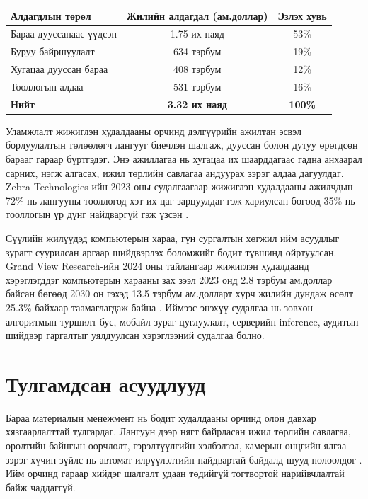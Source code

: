 \begin{table}[H]
\centering
\caption{Жижиглэн худалдааны салбарын бараа материалын алдагдлын статистик}
\label{tab:retail_loss_stats}
\begin{longtable}{|p{5cm}|c|c|}
\hline
\textbf{Алдагдлын төрөл} & \textbf{Жилийн алдагдал (ам.доллар)} & \textbf{Эзлэх хувь} \\
\hline
Бараа дууссанаас үүдсэн & 1.75 их наяд & 53\% \\
\hline
Буруу байршуулалт & 634 тэрбум & 19\% \\
\hline
Хугацаа дууссан бараа & 408 тэрбум & 12\% \\
\hline
Тооллогын алдаа & 531 тэрбум & 16\% \\
\hline
\textbf{Нийт} & \textbf{3.32 их наяд} & \textbf{100\%} \\
\hline
\end{longtable}
\end{table}

Уламжлалт жижиглэн худалдааны орчинд дэлгүүрийн ажилтан эсвэл борлуулалтын төлөөлөгч лангууг биечлэн шалгаж, дууссан болон дутуу өрөгдсөн барааг гараар бүртгэдэг. Энэ ажиллагаа нь хугацаа их шаарддагаас гадна анхаарал сарних, нэгж алгасах, ижил төрлийн савлагаа андуурах зэрэг алдаа дагуулдаг. Zebra Technologies-ийн 2023 оны судалгаагаар жижиглэн худалдааны ажилчдын 72\% нь лангууны тооллогод хэт их цаг зарцуулдаг гэж хариулсан бөгөөд 35\% нь тооллогын үр дүнг найдваргүй гэж үзсэн \cite{zebra_study}.

Сүүлийн жилүүдэд компьютерын хараа, гүн сургалтын хөгжил ийм асуудлыг зурагт суурилсан аргаар шийдвэрлэх боломжийг бодит түвшинд ойртуулсан. Grand View Research-ийн 2024 оны тайлангаар жижиглэн худалдаанд хэрэглэгддэг компьютерын харааны зах зээл 2023 онд 2.8 тэрбум ам.доллар байсан бөгөөд 2030 он гэхэд 13.5 тэрбум ам.долларт хүрч жилийн дундаж өсөлт 25.3\% байхаар таамаглагдаж байна \cite{grand_view_cv}. Иймээс энэхүү судалгаа нь зөвхөн алгоритмын туршилт бус, мобайл зураг цуглуулалт, серверийн inference, аудитын шийдвэр гаргалтыг уялдуулсан хэрэглээний судалгаа болно.

\section{Тулгамдсан асуудлууд}

Бараа материалын менежмент нь бодит худалдааны орчинд олон давхар хязгаарлалттай тулгардаг. Лангуун дээр нягт байрласан ижил төрлийн савлагаа, өрөлтийн байнгын өөрчлөлт, гэрэлтүүлгийн хэлбэлзэл, камерын өнцгийн ялгаа зэрэг хүчин зүйлс нь автомат илрүүлэлтийн найдвартай байдалд шууд нөлөөлдөг \cite{real_time_detection,sku110k,retail_cv_survey}. Ийм орчинд гараар хийдэг шалгалт удаан төдийгүй тогтвортой нарийвчлалтай байж чаддаггүй.

